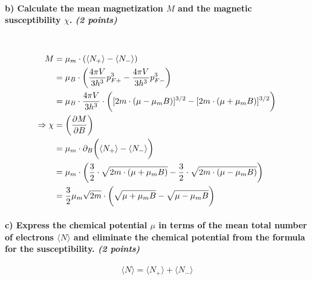\paragraph{b) Calculate the mean magnetization $M$ and the magnetic 
    susceptibility $\chi$. \textit{(2 points)}
} \ \\
    \begin{align}
        M
        &=\mu_m\cdot(\langle N_+\rangle-\langle N_-\rangle) \\
        &=\mu_B\cdot\bigg(
            \frac{4\pi V}{3h^3}p_{F+}^3-
            \frac{4\pi V}{3h^3}p_{F-}^3
        \bigg) \\
        &=\mu_B\cdot\frac{4\pi V}{3h^3}\cdot\bigg(
            [2m\cdot(\mu-\mu_mB)]^{3/2}-
            [2m\cdot(\mu+\mu_mB)]^{3/2}
        \bigg) \\
        \Rightarrow\chi
        &=\bigg(\frac{\partial M}{\partial B}\bigg) \\
        &=\mu_m\cdot\partial_B\bigg(
            \langle N_+\rangle-\langle N_-\rangle
        \bigg) \\
        &=\mu_m\cdot\bigg(
            \frac{3}{2}\cdot\sqrt{2m\cdot(\mu+\mu_mB)}
            -\frac{3}{2}\cdot\sqrt{2m\cdot(\mu-\mu_mB)}
        \bigg) \\
        &=\frac{3}{2}\mu_m\sqrt{2m}\cdot\bigg(
            \sqrt{\mu+\mu_mB}-\sqrt{\mu-\mu_mB}
        \bigg) 
    \end{align}


\paragraph{c) Express the chemical potential $\mu$ in terms of the 
    mean total number of electrons $\langle N\rangle$ and 
    eliminate the chemical potential from the formula 
    for the susceptibility. \textit{(2 points)}
}
    \begin{equation}
        \langle N\rangle
        =\langle N_+\rangle+\langle N_-\rangle
    \end{equation}
